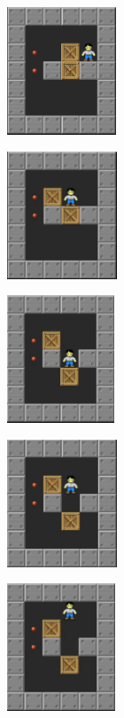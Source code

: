\documentclass[10pt, final]{article}
\begin{document}
				\begin{figure}[h!]
			{
				\begin{subfigure}[h!]{1.3in}
					\includegraphics[height=1.5in]{q1.png}
				\end{subfigure}
				\begin{subfigure}[h!]{1.3in}
					\includegraphics[height=1.5in]{q2.png}
				\end{subfigure}
				\begin{subfigure}[h!]{1.3in}
					\includegraphics[height=1.5in]{q3.png}
				\end{subfigure}
				\begin{subfigure}[h!]{1.3in}
					\includegraphics[height=1.5in]{q4.png}
				\end{subfigure}
				\begin{subfigure}[h!]{1.3in}
					\includegraphics[height=1.5in]{q5.png}
			\end{subfigure}}
			\label{fig:chain}
		\end{figure}
		
\end{document}
